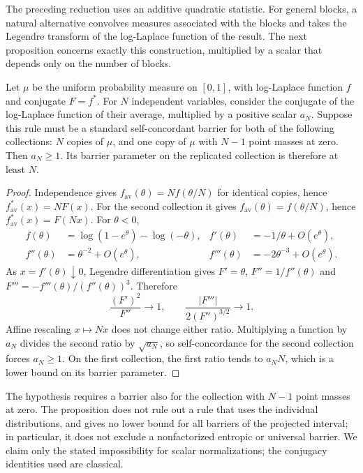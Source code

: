 The preceding reduction uses an additive quadratic statistic.  For
general blocks, a natural alternative convolves measures associated with
the blocks and takes the Legendre transform of the log-Laplace function
of the result.  The next proposition concerns exactly this construction,
multiplied by a scalar that depends only on the number of blocks.

\begin{proposition}
\label{prop:projected-cramer}
Let $\mu$ be the uniform probability measure on $[0,1]$, with log-Laplace
function $f$ and conjugate $F=f^*$.  For $N$ independent variables, consider
the conjugate of the log-Laplace function of their average, multiplied by a
positive scalar $a_N$.  Suppose this rule must be a standard
self-concordant barrier for both of the following collections:
$N$ copies of $\mu$, and one copy of $\mu$ with $N-1$ point masses at zero.
Then $a_N\geq1$.  Its barrier parameter on the replicated collection is
therefore at least $N$.
\end{proposition}
\begin{proof}
Independence gives $f_{\mathrm{av}}(\theta)=Nf(\theta/N)$ for identical
copies, hence $f_{\mathrm{av}}^*(x)=NF(x)$.
For the second collection it gives $f_{\mathrm{av}}(\theta)=f(\theta/N)$,
hence $f_{\mathrm{av}}^*(x)=F(Nx)$.
For $\theta<0$,
\[
 \begin{aligned}
 f(\theta)&=\log(1-e^\theta)-\log(-\theta),&
 f'(\theta)&=-1/\theta+O(e^\theta),\\
 f''(\theta)&=\theta^{-2}+O(e^\theta),&
 f'''(\theta)&=-2\theta^{-3}+O(e^\theta).
 \end{aligned}
\]
As $x=f'(\theta)\downarrow0$, Legendre differentiation gives
$F'=\theta$, $F''=1/f''(\theta)$ and
$F'''=-f'''(\theta)/(f''(\theta))^3$.  Therefore
\[
 \frac{(F')^2}{F''}\longrightarrow1,\qquad
 \frac{|F'''|}{2(F'')^{3/2}}\longrightarrow1.
\]
Affine rescaling $x\mapsto Nx$ does not change either ratio.
Multiplying a function by $a_N$ divides the second ratio by
$\sqrt{a_N}$, so self-concordance for the second collection forces
$a_N\geq1$.  On the first collection, the first ratio tends to $a_NN$,
which is a lower bound on its barrier parameter.
\end{proof}

The hypothesis requires a barrier also for the collection with $N-1$
point masses at zero.  The proposition does not rule out a rule that uses
the individual distributions, and gives no lower bound for all barriers
of the projected interval; in particular, it does not exclude a
nonfactorized entropic or universal barrier.  We claim only the stated
impossibility for scalar normalizations; the conjugacy identities used
are classical.

